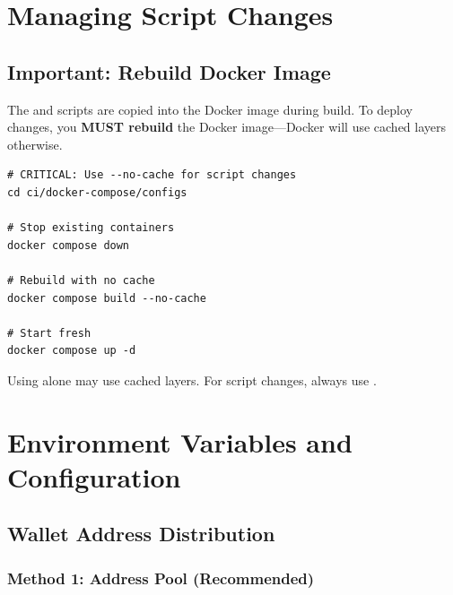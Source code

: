\needspace{2.5in}
\section{Managing Script Changes}
\label{sec:docker-script-changes}

\subsection{Important: Rebuild Docker Image}

The  and  scripts are copied into the Docker image during build. To deploy changes, you \textbf{MUST rebuild} the Docker image---Docker will use cached layers otherwise.

\begin{listing}[htbp]
\caption{Deploying Script Changes}
\label{lst:ch22-rebuild}
\begin{verbatim}
# CRITICAL: Use --no-cache for script changes
cd ci/docker-compose/configs

# Stop existing containers
docker compose down

# Rebuild with no cache
docker compose build --no-cache

# Start fresh
docker compose up -d
\end{verbatim}
\end{listing}

\begin{warnbox}
Using  alone may use cached layers. For script changes, always use .
\end{warnbox}

\section{Environment Variables and Configuration}
\label{sec:docker-config}

\subsection{Wallet Address Distribution}

\subsubsection{Method 1: Address Pool (Recommended)}

